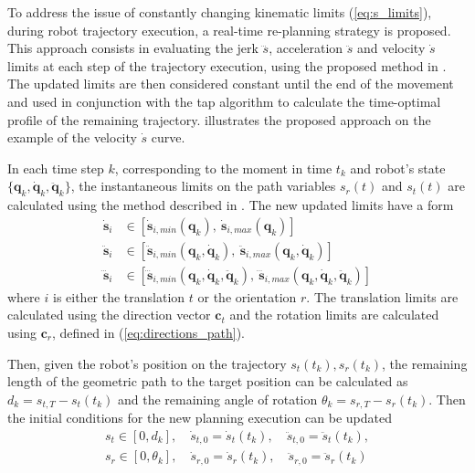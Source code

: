 To address the issue of constantly changing kinematic limits (\ref{eq:s_limits}), during robot trajectory execution, a real-time re-planning strategy is proposed. This approach consists in evaluating the jerk $\dddot{s}$, acceleration $\ddot{s}$ and velocity $\dot{s}$ limits at each step of the trajectory execution, using the proposed method in . 
The updated limits are then considered constant until the end of the movement and used in conjunction with the \gls{tap} algorithm to calculate the time-optimal profile of the remaining trajectory.  
 illustrates the proposed approach on the example of the velocity $\dot{s}$ curve. 


In each time step $k$, corresponding to the moment in time $t_k$ and robot's state $\{\bm{q}_k,\dot{\bm{q}}_k,\ddot{\bm{q}}_k\}$, the instantaneous limits on the path variables $s_r(t)$ and $s_t(t)$ are calculated using the method described in . The new updated limits have a form
\begin{equation}
\begin{split}
    \dot{\bm{s}}_i &\in [\dot{\bm{s}}_{i,min}(\bm{q}_k),~ \dot{\bm{s}}_{i,max}(\bm{q}_k) ]\\
    \ddot{\bm{s}}_i &\in [\ddot{\bm{s}}_{i,min}(\bm{q}_k, \dot{\bm{q}}_k),~ \ddot{\bm{s}}_{i,max}(\bm{q}_k, \dot{\bm{q}}_k) ]\\
    \dddot{\bm{s}}_i &\in [\dddot{\bm{s}}_{i,min}(\bm{q}_k, \dot{\bm{q}}_k, \ddot{\bm{q}}_k),~ \dddot{\bm{s}}_{i,max}(\bm{q}_k, \dot{\bm{q}}_k, \ddot{\bm{q}}_k) ]
\end{split}
\label{eq:range_in_path_direction_revisit}
\end{equation}
where $i$ is either the translation $t$ or the orientation $r$. The translation limits are calculated using the direction vector $\bm{c}_t$ and the rotation limits are calculated using $\bm{c}_r$, defined in (\ref{eq:directions_path}). 

Then, given the robot's position on the trajectory $s_t(t_k),s_r(t_k)$, the remaining length of the geometric path to the target position can be calculated as $d_k = s_{t,T} - s_t(t_k)$ and the remaining angle of rotation $\theta_k\!=\!s_{r,T}\! - \!s_r(t_k)$. Then the initial conditions for the new planning execution can be updated 
\begin{equation}
\begin{split}
    s_t \in [0, d_k], \quad \dot{s}_{t,0} = \dot{s}_t(t_k), \quad \ddot{s}_{t,0} = \ddot{s}_t(t_k),\\ 
    s_r \in [0 , \theta_k], \quad \dot{s}_{r,0} = \dot{s}_r(t_k), \quad \ddot{s}_{r,0} = \ddot{s}_r(t_k)
\end{split}\label{eq:rt_init}
\end{equation}

